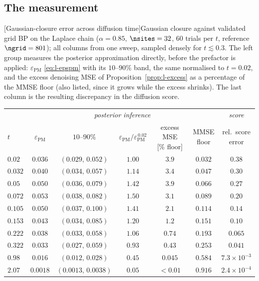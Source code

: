 \subsection{The measurement}

\begin{center}
\begin{minipage}{\linewidth}\centering
{}[Gaussian-closure error across diffusion time]{Gaussian
closure against validated grid BP on the Laplace chain ($\alpha=0.85$,
$\nsites=32$, $60$ trials per $t$, reference $\ngrid=801$); all columns from
one sweep, sampled densely for $t\lesssim0.3$. The left group measures the
posterior approximation directly, before the  prefactor is applied:
$\varepsilon_{\mathrm{PM}}$ \eqref{eq:l-epspm} with its $10$--$90\%$ band, the
same normalised to $t=0.02$, and the excess denoising MSE of
Proposition~\ref{prop:l-excess} as a percentage of the MMSE floor (also
listed, since it grows while the excess shrinks). The last column is the
resulting discrepancy in the diffusion score.}
\label{tab:l-closure}
\small
\setlength{\tabcolsep}{5pt}
\renewcommand{\arraystretch}{1.1}
\begin{tabular}{@{}lccccc c@{}}
\toprule
& \multicolumn{5}{c}{\textit{posterior inference}}
& \textit{score} \\
\cmidrule(lr){2-6}\cmidrule(l){7-7}
$t$
& $\varepsilon_{\mathrm{PM}}$
& $10$--$90\%$
& $\varepsilon_{\mathrm{PM}}/\varepsilon_{\mathrm{PM}}^{\,0.02}$
& \shortstack{excess MSE\\{}[\% floor]}
& \shortstack{MMSE\\floor}
& \shortstack{rel.\ score\\error} \\
\midrule
$0.02$  & $0.036$  & $(0.029,\,0.052)$   & $1.00$ & $3.9$   & $0.032$ & $0.38$ \\
$0.032$ & $0.040$  & $(0.034,\,0.057)$   & $1.14$ & $3.4$   & $0.047$ & $0.30$ \\
$0.05$  & $0.050$  & $(0.036,\,0.079)$   & $1.42$ & $3.9$   & $0.066$ & $0.27$ \\
$0.072$ & $0.053$  & $(0.038,\,0.082)$   & $\mathbf{1.50}$ & $3.1$ & $0.089$ & $0.20$ \\
$0.105$ & $0.050$  & $(0.037,\,0.100)$   & $1.41$ & $2.1$   & $0.114$ & $0.14$ \\
$0.153$ & $0.043$  & $(0.034,\,0.085)$   & $1.20$ & $1.2$   & $0.151$ & $0.10$ \\
$0.222$ & $0.038$  & $(0.033,\,0.058)$   & $1.06$ & $0.74$  & $0.193$ & $0.065$ \\
$0.322$ & $0.033$  & $(0.027,\,0.059)$   & $0.93$ & $0.43$  & $0.253$ & $0.041$ \\
\addlinespace
$0.98$  & $0.016$  & $(0.012,\,0.028)$   & $0.45$ & $0.045$ & $0.584$ & $7.3\times10^{-3}$ \\
$2.07$  & $0.0018$ & $(0.0013,\,0.0038)$ & $0.05$ & $<0.01$ & $0.916$ & $2.4\times10^{-4}$ \\
\bottomrule
\end{tabular}
\end{minipage}
\end{center}

